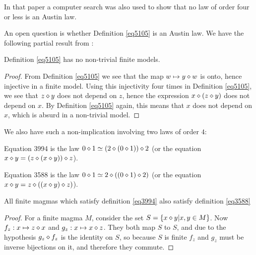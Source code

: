 In that paper a computer search was also used to show that no law of order four or less is an Austin law.

An open question is whether Definition \ref{eq5105} is an Austin law.  We have the following partial result from \cite{Kisielewicz2}:

\begin{theorem}\leanok\label{5105-nontrivial} Definition \ref{eq5105} has no non-trivial finite models.
\end{theorem}

\begin{proof} \leanok From Definition \ref{eq5105} we see that the map $w \mapsto y \diamond w$ is onto, hence injective in a finite model.  Using this injectivity four times in Definition \ref{eq5105}, we see that $z \diamond y$ does not depend on $z$, hence the expression
$x \diamond (z \diamond y)$ does not depend on $x$.  By Definition \ref{eq5105} again, this means that $x$ does not depend on $x$, which is absurd in a non-trivial model.
\end{proof}

We also have such a non-implication involving two laws of order $4$:
\begin{definition}[Equation 3994]
  \label{eq3994}
  Equation 3994 is the law $0 \diamond 1 \simeq (2 \diamond (0 \diamond 1)) \diamond 2$ (or the equation $x \diamond y = (z \diamond (x \diamond y)) \diamond z$).
\end{definition}

\begin{definition}[Equation 3588]
  \label{eq3588}
  Equation 3588 is the law $0 \diamond 1 \simeq 2 \diamond ((0 \diamond 1) \diamond 2)$ (or the equation $x \diamond y = z \diamond ((x \diamond y) \diamond z)$).
\end{definition}

\begin{theorem}\label{finite_imp_3994_3588_thm}
  \leanok
  All finite magmas which satisfy definition \ref{eq3994} also satisfy definition \ref{eq3588}
\end{theorem}

\begin{proof}\label{finite_imp_3994_3588} \leanok
  For a finite magma $M$, consider the set $S = \{x \diamond y | x, y \in M\}$.
  Now $f_z : x \mapsto z \diamond x$ and $g_z : x \mapsto x \diamond z$.
  They both map $S$ to $S$, and due to the hypothesis $g_z \diamond f_z$ is the identity on $S$,
  so because $S$ is finite $f_z$ and $g_z$ must be inverse bijections on it, and therefore
  they commute.
\end{proof}

